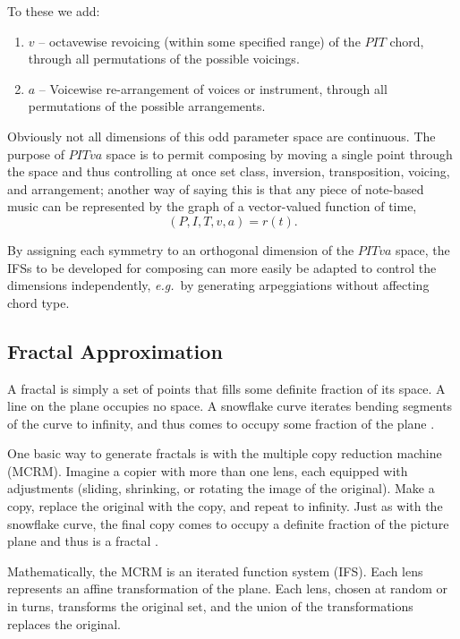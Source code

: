 \documentclass[english,11pt,letterpaper,onecolumn]{scrartcl}
\numberwithin{equation}{section}
\begin{document}
    \noindent To these we add:
    
    \begin{enumerate}[resume]
        \item $v$ -- octavewise revoicing (within some specified range) of the 
        $PIT$ chord, through all permutations of the possible voicings.
        \item $a$ -- Voicewise re-arrangement of voices or instrument, through all
        permutations of the possible arrangements.
    \end{enumerate}
    
    \noindent Obviously not all dimensions of this odd parameter space are 
    continuous. The purpose of $PITva$ space is to permit composing by moving a 
    single point through the space and thus controlling at once set class, 
    inversion, transposition, voicing, and arrangement; another way of saying this 
    is that any piece of note-based music can be represented by the 
    graph of a vector-valued function of time, $$(P, I, T, v, a) = 
    r(t).$$
    
    By assigning each symmetry to an orthogonal dimension of the $PITva$ space, the 
    IFSs to be developed for composing can more easily be adapted to control the 
    dimensions independently, \textit{e.g.}\ by generating arpeggiations without 
    affecting chord type.
    
    \subsection{Fractal Approximation}
    
    A fractal is simply a set of points that fills some definite fraction of its 
    space. A line on the plane occupies no space. A snowflake curve iterates 
    bending segments of the curve to infinity, and thus comes to occupy some 
    fraction of the plane \cite{Mandelbrot:1982:FGN}.
    
    One basic way to generate fractals is with the multiple copy reduction 
    machine (MCRM). Imagine a copier with more than one lens, each equipped with 
    adjustments (sliding, shrinking, or rotating the image of the original). Make 
    a copy, replace the original with the copy, and repeat to infinity. Just as 
    with the snowflake curve, the final copy comes to occupy a definite fraction 
    of the picture plane and thus is a fractal \cite{chaosandfractals}. 
    
    Mathematically, the MCRM is an iterated function system (IFS). Each lens 
    represents an affine transformation of the plane. Each lens, chosen at random 
    or in turns, transforms the original set, and the union of the transformations  
    replaces the original.
    
\end{document}
